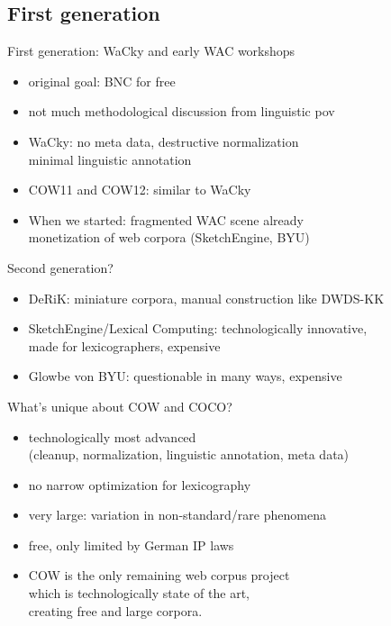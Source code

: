 
\subsection{First generation}

\begin{frame}
	{First generation: WaCky and early WAC workshops}
	\begin{itemize}
  		\item original goal: BNC for free
  		\item not much methodological discussion from linguistic pov
  		\item WaCky: no meta data, destructive normalization\\minimal linguistic annotation
  		\item COW11 and COW12: similar to WaCky
  		
  		\vspace{0.5cm}
  			
  		\item When we started: fragmented WAC scene already\\monetization of web corpora (SketchEngine, BYU)
	\end{itemize}
\end{frame}

\begin{frame}
	{Second generation?}
	\begin{itemize}
	  \item DeRiK: \alert{miniature corpora}, manual construction like DWDS-KK
	  \item SketchEngine\slash Lexical Computing: technologically innovative,\\made for lexicographers, \alert{expensive}
	  \item Glowbe von BYU: questionable in many ways, \alert{expensive}
	\end{itemize}
\end{frame}

\begin{frame}
	{What's unique about COW and COCO?}
	\begin{itemize}
	  \item technologically most advanced\\(cleanup, normalization, linguistic annotation, meta data)
	  \item no narrow optimization for lexicography
	  \item \alert{very large}: variation in non-standard\slash rare phenomena
	  \item \alert{free}, only limited by German IP laws
	  
	  \vspace{0.5cm}
	   
	  \item \alert{COW is the only remaining web corpus project\\which is technologically state of the art,\\creating free and large corpora.}
	\end{itemize}
\end{frame}

